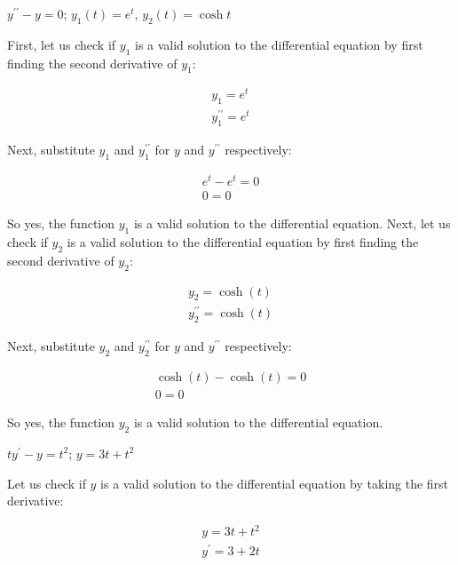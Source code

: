 \documentclass{lapchomework}
\begin{document}
\begin{problems}

\problem[5] $y^{\prime\prime}-y=0$; $y_1(t)=e^t$, $y_2(t)=\cosh{t}$

\begin{solution}

\step First, let us check if $y_1$ is a valid solution to the differential 
equation by first finding the second derivative of $y_1$:

\step \begin{gather*}
y_1 = e^t \\
y_1^{\prime\prime}=e^t
\end{gather*}

\step Next, substitute $y_1$ and $y_1^{\prime\prime}$ for $y$ and 
$y^{\prime\prime}$ respectively:

\step \begin{gather*}
e^{t} - e^{t} = 0\\
\boxed{0 = 0}
\end{gather*}

\step So yes, the function $y_1$ is a valid solution to the differential 
equation. Next, let us check if $y_2$ is a valid solution to the differential 
equation by first finding the second derivative of $y_2$:

\step \begin{gather*}
y_2 = \cosh{(t)}\\
y_2^{\prime\prime}=\cosh{(t)}
\end{gather*}

\step Next, substitute $y_2$ and $y_2^{\prime\prime}$ for $y$ and 
$y^{\prime\prime}$ respectively:

\step \begin{gather*}
\cosh{(t)} - \cosh{(t)} = 0\\
\boxed{0 = 0}
\end{gather*}

\step So yes, the function $y_2$ is a valid solution to the differential 
equation.
\end{solution}

\problem[7] $ty^{\prime}-y=t^2$; $y=3t+t^2$
\begin{solution}

\step Let us check if $y$ is a valid solution to the differential
equation by taking the first derivative:

\step \begin{gather*}
y=3t+t^2\\
y^{\prime}=3+2t
\end{gather*}


\end{solution}
\end{problems}
\end{document}
